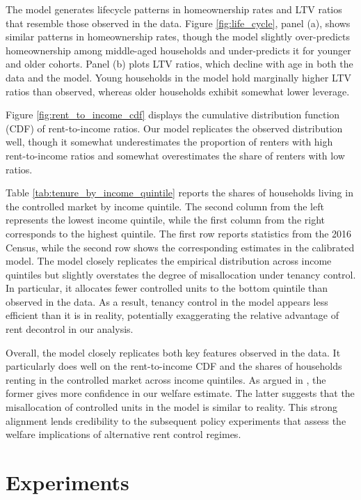 \documentclass[parskip=full]{article}
\begin{document}
The model generates lifecycle patterns in homeownership rates and LTV ratios that resemble those observed in the data. Figure \ref{fig:life_cycle}, panel (a), shows similar patterns in homeownership rates, though the model slightly over-predicts homeownership among middle-aged households and under-predicts it for younger and older cohorts. Panel (b) plots LTV ratios, which decline with age in both the data and the model. Young households in the model hold marginally higher LTV ratios than observed, whereas older households exhibit somewhat lower leverage.

Figure \ref{fig:rent_to_income_cdf} displays the cumulative distribution function (CDF) of rent-to-income ratios. Our model replicates the observed distribution well, though it somewhat underestimates the proportion of renters with high rent-to-income ratios and somewhat overestimates the share of renters with low ratios.

Table \ref{tab:tenure_by_income_quintile} reports the shares of households living in the controlled market by income quintile. The second column from the left represents the lowest income quintile, while the first column from the right corresponds to the highest quintile. The first row reports statistics from the 2016 Census, while the second row shows the corresponding estimates in the calibrated model. The model closely replicates the empirical distribution across income quintiles but slightly overstates the degree of misallocation under tenancy control. In particular, it allocates fewer controlled units to the bottom quintile than observed in the data. As a result, tenancy control in the model appears less efficient than it is in reality, potentially exaggerating the relative advantage of rent decontrol in our analysis.

Overall, the model closely replicates both key features observed in the data. It particularly does well on the rent-to-income CDF and the shares of households renting in the controlled market across income quintiles. As argued in \citet{rs-2023}, the former gives more confidence in our welfare estimate. The latter suggests that the misallocation of controlled units in the model is similar to reality. This strong alignment lends credibility to the subsequent policy experiments that assess the welfare implications of alternative rent control regimes.

\section{Experiments}\label{section:experiments}
\end{document}
